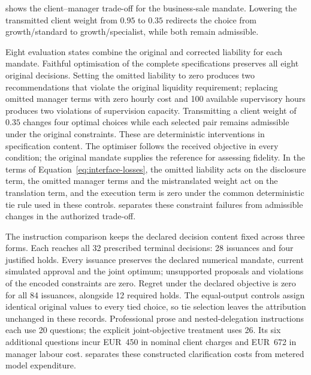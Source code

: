 \documentclass[oneside,10pt,english]{swissi}
\begin{document}
 shows the client--manager trade-off for the business-sale mandate. Lowering the transmitted client weight from $0.95$ to $0.35$ redirects the choice from growth/standard to growth/specialist, while both remain admissible.



Eight evaluation states combine the original and corrected liability for each mandate. Faithful optimisation of the complete specifications preserves all eight original decisions. Setting the omitted liability to zero produces two recommendations that violate the original liquidity requirement; replacing omitted manager terms with zero hourly cost and 100 available supervisory hours produces two violations of supervision capacity. Transmitting a client weight of $0.35$ changes four optimal choices while each selected pair remains admissible under the original constraints. These are deterministic interventions in specification content. The optimiser follows the received objective in every condition; the original mandate supplies the reference for assessing fidelity. In the terms of Equation~\eqref{eq:interface-losses}, the omitted liability acts on the disclosure term, the omitted manager terms and the mistranslated weight act on the translation term, and the execution term is zero under the common deterministic tie rule used in these controls.  separates these constraint failures from admissible changes in the authorized trade-off.



The instruction comparison keeps the declared decision content fixed across three forms. Each reaches all 32 prescribed terminal decisions: 28 issuances and four justified holds. Every issuance preserves the declared numerical mandate, current simulated approval and the joint optimum; unsupported proposals and violations of the encoded constraints are zero. Regret under the declared objective is zero for all 84 issuances, alongside 12 required holds. The equal-output controls assign identical original values to every tied choice, so tie selection leaves the attribution unchanged in these records. Professional prose and nested-delegation instructions each use 20 questions; the explicit joint-objective treatment uses 26. Its six additional questions incur EUR~450 in nominal client charges and EUR~672 in manager labour cost.  separates these constructed clarification costs from metered model expenditure.
\end{document}
